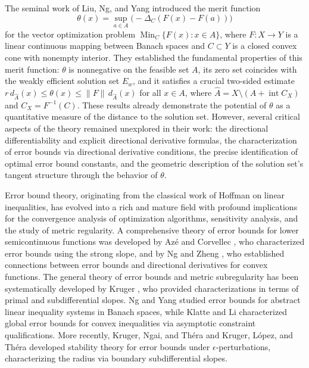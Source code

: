 \documentclass[11pt]{article}
\begin{document}
The seminal work of Liu, Ng, and Yang \cite{LiuNgYang2009} introduced the merit function
\[
\theta(x)=\sup_{a\in A}\bigl(-\Delta_C(F(x)-F(a))\bigr)
\]
for the vector optimization problem \(\operatorname{Min}_C\{F(x):x\in A\}\), where \(F:X\to Y\) is a linear continuous mapping between Banach spaces and \(C\subset Y\) is a closed convex cone with nonempty interior. They established the fundamental properties of this merit function: \(\theta\) is nonnegative on the feasible set \(A\), its zero set coincides with the weakly efficient solution set \(E_w\), and it satisfies a crucial two-sided estimate \(r\,d_{\widehat A}(x)\le \theta(x)\le \|F\|\,d_{\widehat A}(x)\) for all \(x\in A\), where \(\widehat A = X\setminus(A+\operatorname{int}C_X)\) and \(C_X=F^{-1}(C)\). These results already demonstrate the potential of \(\theta\) as a quantitative measure of the distance to the solution set. However, several critical aspects of the theory remained unexplored in their work: the directional differentiability and explicit directional derivative formulas, the   characterization of error bounds via directional derivative conditions, the precise identification of optimal error bound constants, and the   geometric description of the solution set's tangent structure through the behavior of \(\theta\).

Error bound theory, originating from the classical work of Hoffman \cite{Hoffman} on linear inequalities, has evolved into a rich and mature field with profound implications for the convergence analysis of optimization algorithms, sensitivity analysis, and the study of metric regularity.   A comprehensive theory of error bounds for lower semicontinuous functions was developed by Az\'e and Corvellec \cite{AC2004}, who characterized error bounds using the strong slope, and by Ng and Zheng \cite{NgZheng}, who established connections between error bounds and directional derivatives for convex functions. The general theory of error bounds and metric subregularity has been systematically developed by Kruger \cite{Kruger}, who provided characterizations in terms of primal and subdifferential slopes.  
Ng and Yang \cite{NgYang2002} studied error bounds for abstract linear inequality systems in Banach spaces, while  Klatte and Li   \cite{KL1999} characterized global error bounds for convex inequalities via asymptotic constraint qualifications.
More recently, Kruger, Ngai, and Théra \cite{KNT2010} and Kruger, López, and Théra \cite{KLT2018} developed stability theory for error bounds under  $\epsilon$-perturbations, characterizing the radius via boundary subdifferential slopes.  
\end{document}
